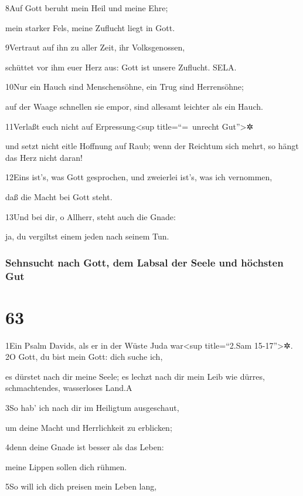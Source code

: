 8Auf Gott beruht mein Heil und meine Ehre;

mein starker Fels, meine Zuflucht liegt in Gott.

9Vertraut auf ihn zu aller Zeit, ihr Volksgenossen,

schüttet vor ihm euer Herz aus: Gott ist unsere Zuflucht. SELA.

10Nur ein Hauch sind Menschensöhne, ein Trug sind Herrensöhne;

auf der Waage schnellen sie empor, sind allesamt leichter als ein Hauch.

11Verlaßt euch nicht auf Erpressung\textless sup title=``=~unrecht
Gut''\textgreater✲

und setzt nicht eitle Hoffnung auf Raub; wenn der Reichtum sich mehrt,
so hängt das Herz nicht daran!

12Eins ist's, was Gott gesprochen, und zweierlei ist's, was ich
vernommen,

daß die Macht bei Gott steht.

13Und bei dir, o Allherr, steht auch die Gnade:

ja, du vergiltst einem jeden nach seinem Tun.

\hypertarget{sehnsucht-nach-gott-dem-labsal-der-seele-und-huxf6chsten-gut}{%
\subsubsection{Sehnsucht nach Gott, dem Labsal der Seele und höchsten
Gut}\label{sehnsucht-nach-gott-dem-labsal-der-seele-und-huxf6chsten-gut}}

\hypertarget{section-62}{%
\section{63}\label{section-62}}

1Ein Psalm Davids, als er in der Wüste Juda war\textless sup
title=``2.Sam 15-17''\textgreater✲. 2O Gott, du bist mein Gott: dich
suche ich,

es dürstet nach dir meine Seele; es lechzt nach dir mein Leib wie
dürres, schmachtendes, wasserloses Land.{A}

3So hab' ich nach dir im Heiligtum ausgeschaut,

um deine Macht und Herrlichkeit zu erblicken;

4denn deine Gnade ist besser als das Leben:

meine Lippen sollen dich rühmen.

5So will ich dich preisen mein Leben lang,

